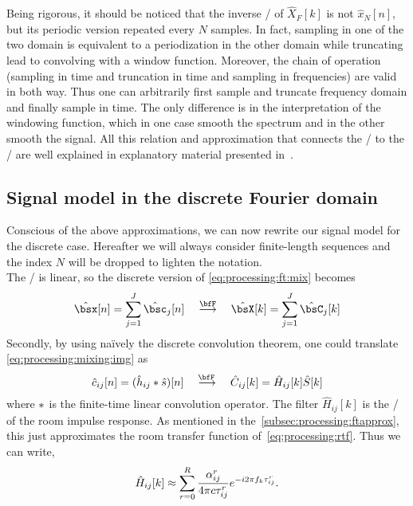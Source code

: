 \mynewline
Being rigorous, it should be noticed that the inverse \DFT/ of $\hat{X}_F[k]$ is not $\hat{x}_N[n]$, but its periodic version repeated every $N$ samples.
In fact, sampling in one of the two domain is equivalent to a periodization in the other domain while truncating lead to convolving with a window function.
Moreover, the chain of operation (sampling in time and truncation in time and sampling in frequencies) are valid in both way.
Thus one can arbitrarily first sample and truncate frequency domain and finally sample in time.
The only difference is in the interpretation of the windowing function, which in one case smooth the spectrum and in the other smooth the signal.
All this relation and approximation that connects the \FT/ to the \DFT/ are well explained in explanatory material presented in~.



\subsection{Signal model in the discrete Fourier domain}
Conscious of the above approximations, we can now rewrite our signal model for the discrete case.
Hereafter we will always consider finite-length sequences and the index $N$ will be dropped to lighten the notation.
\\The \DFT/ is linear, so the discrete version of \cref{eq:processing:ft:mix} becomes
\begin{equation}\label{eq:processing:dft:mix}
    \hat{\mics}[ n] = \sum_{\idxSrc=1}^{\numSrcs} \hat{\imgs}_\idxSrc[ n]
    \mathspace\overset{\discreteFT}{\kto}\mathspace
    \hat{\MICS}[ k] = \sum_{\idxSrc=1}^{\numSrcs} \hat{\IMGS}_\idxSrc[ k]
\end{equation}
Secondly, by using na\"ively the discrete convolution theorem, one could translate \cref{eq:processing:mixing:img} as
\begin{equation}\label{eq:processing:discreteModel}
    \hat{\img}_{ij}[n] = (\hat{\rir}_{ij} \convDis \hat{\src})[n]
    \mathspace\overset{\discreteFT{}}{\kto}\mathspace
    \hat{C}_{ij}[k] = \hat{H}_{ij}[k] \hat{S}[k]
\end{equation}
where $\ast$ is the finite-time linear convolution operator.
The filter $\hat{H}_{ij}[k]$ is the \DFT/ of the room impulse response.
As mentioned in the~\cref{subsec:processing:ftapprox}, this just approximates the room transfer function of~\cref{eq:processing:rtf}.
Thus we can write,
\begin{equation}\label{eq:processing:discreteModel:rir}
    \hat{H}_{ij}[ k] \approx \sum_{r=0}^{R}
                \frac{\alpha_{ij}^r}{4 \pi c \tau_{ij}^r}
                {e}^{- {i} 2 \pi f_k \tau_{ij}^r}
    .
\end{equation}

